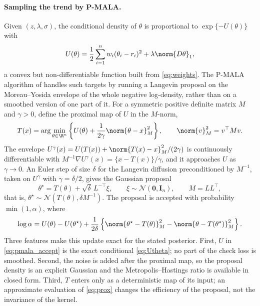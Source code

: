 \paragraph{Sampling the trend by P-MALA.} Given $(z, \lambda, \sigma)$, the conditional density of $\theta$ is proportional to $\exp\{-U(\theta)\}$ with
\begin{equation}
    U(\theta) = \frac{1}{2}\sum_{i=1}^n w_i (\theta_i - r_i)^2 + \lambda \norm{D\theta}_1,
    \label{eq:Utheta}
\end{equation}
a convex but non-differentiable function built from \eqref{eq:weights}. The P-MALA algorithm of \citet{pereyra2016proximal} handles such targets by running a Langevin proposal on the Moreau--Yosida envelope of the whole negative log-density, rather than on a smoothed version of one part of it. For a symmetric positive definite matrix $M$ and $\gamma > 0$, define the proximal map of $U$ in the $M$-norm,
\begin{equation}
    T(x) = \arg\min_{\theta \in \R^n} \left\{ U(\theta) + \frac{1}{2\gamma}\norm{\theta - x}_M^2 \right\}, \qquad \norm{v}_M^2 = v^\top M v .
    \label{eq:prox}
\end{equation}
The envelope $U^\gamma(x) = U(T(x)) + \norm{T(x)-x}_M^2/(2\gamma)$ is continuously differentiable with $M^{-1}\nabla U^\gamma(x) = \{x - T(x)\}/\gamma$, and it approaches $U$ as $\gamma \to 0$. An Euler step of size $\delta$ for the Langevin diffusion preconditioned by $M^{-1}$, taken on $U^\gamma$ with $\gamma = \delta/2$, gives the Gaussian proposal
\begin{equation}
    \theta^\star = T(\theta) + \sqrt{\delta}\, L^{-\top} \xi, \qquad \xi \sim \mathcal{N}(\mathbf{0}, \mathbf{I}_n), \qquad M = L L^\top,
    \label{eq:pmala_proposal}
\end{equation}
that is, $\theta^\star \sim \mathcal{N}(T(\theta), \delta M^{-1})$. The proposal is accepted with probability $\min(1,\alpha)$, where
\begin{equation}
    \log \alpha = U(\theta) - U(\theta^\star) + \frac{1}{2\delta}\left\{ \norm{\theta^\star - T(\theta)}_M^2 - \norm{\theta - T(\theta^\star)}_M^2 \right\}.
    \label{eq:pmala_accept}
\end{equation}
Three features make this update exact for the stated posterior. First, $U$ in \eqref{eq:pmala_accept} is the exact conditional \eqref{eq:Utheta}; no part of the check loss is smoothed. Second, the noise is added after the proximal map, so the proposal density is an explicit Gaussian and the Metropolis--Hastings ratio is available in closed form. Third, $T$ enters only as a deterministic map of its input; an approximate evaluation of \eqref{eq:prox} changes the efficiency of the proposal, not the invariance of the kernel.

